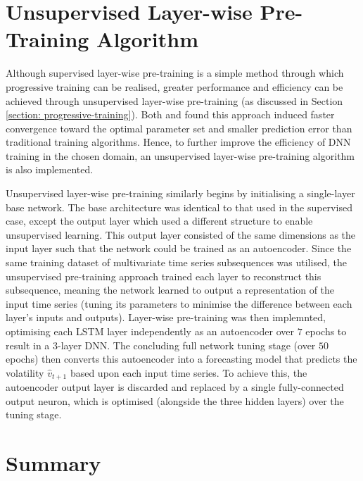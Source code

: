 \documentclass[a4paper, 11pt]{report}
\begin{document}
    \section{Unsupervised Layer-wise Pre-Training Algorithm}

    Although supervised layer-wise pre-training is a simple method through which progressive training can be realised, greater performance and efficiency can be achieved through unsupervised layer-wise pre-training (as discussed in Section \ref{section: progressive-training}). Both \citet{xu-2018} and \citet{sagheer-2019} found this approach induced faster convergence toward the optimal parameter set and smaller prediction error than traditional training algorithms. Hence, to further improve the efficiency of DNN training in the chosen domain, an unsupervised layer-wise pre-training algorithm is also implemented.

    Unsupervised layer-wise pre-training similarly begins by initialising a single-layer base network. The base architecture was identical to that used in the supervised case, except the output layer which used a different structure to enable unsupervised learning. This output layer consisted of the same dimensions as the input layer such that the network could be trained as an autoencoder. Since the same training dataset of multivariate time series subsequences was utilised, the unsupervised pre-training approach trained each layer to reconstruct this subsequence, meaning the network learned to output a representation of the input time series (tuning its parameters to minimise the difference between each layer's inputs and outputs). Layer-wise pre-training was then implemnted, optimising each LSTM layer independently as an autoencoder over $7$ epochs to result in a 3-layer DNN. The concluding full network tuning stage (over $50$ epochs) then converts this autoencoder into a forecasting model that predicts the volatility $\hat{v}_{t+1}$ based upon each input time series. To achieve this, the autoencoder output layer is discarded and replaced by a single fully-connected output neuron, which is optimised (alongside the three hidden layers) over the tuning stage.


    \section{Summary}
\end{document}
